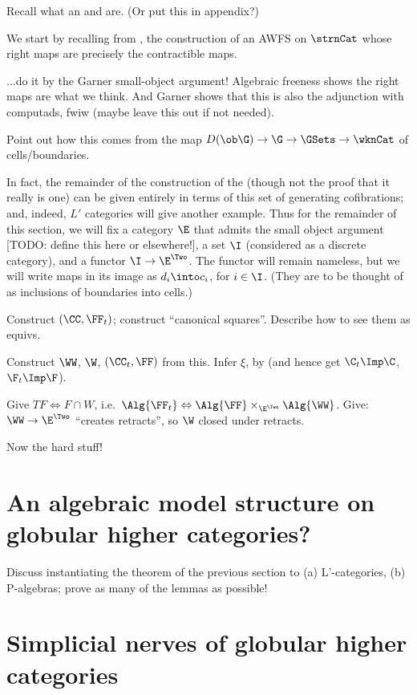 \para Recall what an \AWFS and \AMS are.  (Or put this in appendix?)

\para We start by recalling from \cite{garner:understanding}, \cite{garner:homomorphisms} the construction of an AWFS on $\strnCat$ whose right maps are precisely the contractible maps.

...do it by the Garner small-object argument!  Algebraic freeness shows the right maps are what we think.  And Garner shows that this is also the adjunction with computads, fwiw (maybe leave this out if not needed).

Point out how this comes from the map $D(\ob \G) \to \G \to \GSets \to \wknCat$ of cells/boundaries.

\para In fact, the remainder of the construction of the \AMS (though not the proof that it really is one) can be given entirely in terms of this set of generating cofibrations; and, indeed, $L'$ categories will give another example.  Thus for the remainder of this section, we will fix a category $\E$ that admits the small object argument [TODO: define this here or elsewhere!], a set $\I$ (considered as a discrete category), and a functor $\I \to \E^\Two$.  The functor will remain nameless, but we will write maps in its image as  $d_i \into c_i$, for $i \in \I$.  (They are to be thought of as inclusions of boundaries into cells.)

\para Construct $(\CC,\FF_t)$; construct ``canonical squares''.  Describe how to see them as equivs.

\para Construct $\WW$, $\W$, $(\CC_t,\FF)$ from this.  Infer $\xi$, by \cite[Rmk 3.6]{riehl:alg-mod-strux} (and hence get $\C_t \Imp \C$, $\F_t \Imp \F$).

\para Give $TF \Leftrightarrow F \cap W$, i.e.\ $\Alg{\FF_t} \Leftrightarrow \Alg{\FF} \times_{\E^\Two} \Alg{\WW}$.  Give: $\WW \to \E^\Two$ ``creates retracts'', so $\W$ closed under retracts.

\para Now the hard stuff!

\section{An algebraic model structure on globular higher categories?} \label{sec:model-strux-specific}

\para Discuss instantiating the theorem of the previous section to (a) L'-categories, (b) P-algebras; prove as many of the lemmas as possible!

\section{Simplicial nerves of globular higher categories} \label{sec:simplicial-nerves}

